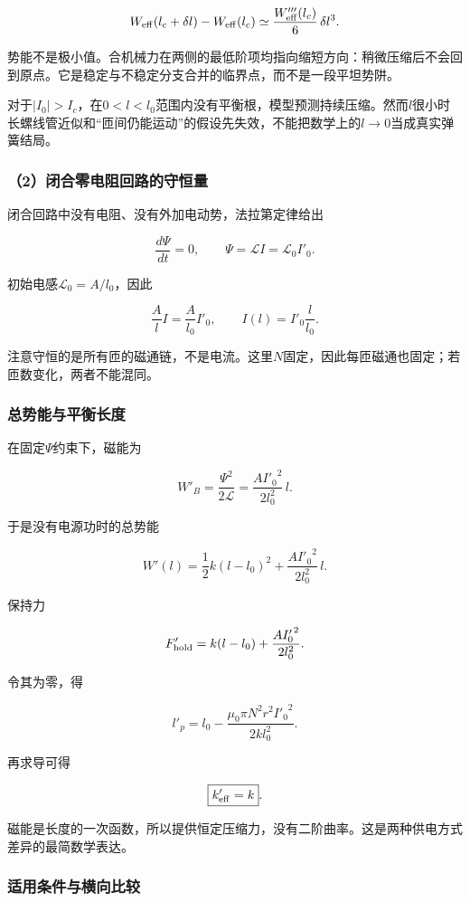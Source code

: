 \documentclass[12pt,a4paper,fontset=fandol]{ctexart}
\begin{document}
\[
W_{\rm eff}(l_c+\delta l)
-W_{\rm eff}(l_c)
\simeq\frac{W'''_{\rm eff}(l_c)}6\,\delta l^3.
\]

势能不是极小值。合机械力在两侧的最低阶项均指向缩短方向：稍微压缩后不会回到原点。它是稳定与不稳定分支合并的临界点，而不是一段平坦势阱。

对于\(|I_0|>I_c\)，在\(0<l<l_0\)范围内没有平衡根，模型预测持续压缩。然而\(l\)很小时长螺线管近似和``匝间仍能运动''的假设先失效，不能把数学上的\(l\to0\)当成真实弹簧结局。

\subsubsection{（2）闭合零电阻回路的守恒量}\label{ux95edux5408ux96f6ux7535ux963bux56deux8defux7684ux5b88ux6052ux91cf}

闭合回路中没有电阻、没有外加电动势，法拉第定律给出

\[
\frac{d\Psi}{dt}=0,
\qquad \Psi=\mathcal LI=\mathcal L_0I'_0.
\]

初始电感\(\mathcal L_0=A/l_0\)，因此

\[
\frac Al I=\frac A{l_0}I'_0,
\qquad \boxed{I(l)=I'_0\frac l{l_0}}.
\]

注意守恒的是所有匝的磁通链，不是电流。这里\(N\)固定，因此每匝磁通也固定；若匝数变化，两者不能混同。

\subsubsection{总势能与平衡长度}\label{ux603bux52bfux80fdux4e0eux5e73ux8861ux957fux5ea6}

在固定\(\Psi\)约束下，磁能为

\[
W'_B=\frac{\Psi^2}{2\mathcal L}
=\frac{A{I'_0}^2}{2l_0^2}\,l.
\]

于是没有电源功时的总势能

\[
W'(l)=\frac12k(l-l_0)^2
+\frac{A{I'_0}^2}{2l_0^2}\,l.
\]

保持力

\[
F'_{\rm hold}=k(l-l_0)
+\frac{A{I'_0}^2}{2l_0^2}.
\]

令其为零，得

\[
\boxed{l'_p=l_0-\frac{\mu_0\pi N^2r^2{I'_0}^2}{2kl_0^2}}.
\]

再求导可得

\[
\boxed{k'_{\rm eff}=k}.
\]

磁能是长度的一次函数，所以提供恒定压缩力，没有二阶曲率。这是两种供电方式差异的最简数学表达。

\subsubsection{适用条件与横向比较}\label{ux9002ux7528ux6761ux4ef6ux4e0eux6a2aux5411ux6bd4ux8f83}
\end{document}
